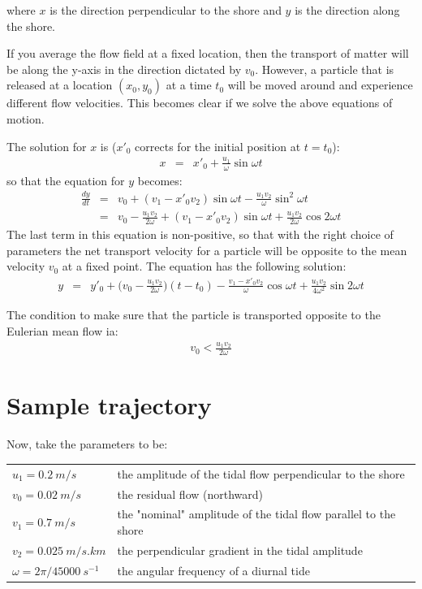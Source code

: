 \documentclass[onecolumn]{article}
\begin{document}
\noindent where $x$ is the direction perpendicular to the shore and $y$ is the direction along the shore.

If you average the flow field at a fixed location, then the transport of matter will
be along the y-axis in the direction dictated by $v_0$. However, a particle that is
released at a location $(x_0,y_0)$ at a time $t_0$ will be moved around and experience
different flow velocities. This becomes clear if we solve the above equations of motion.

The solution for $x$ is ($x'_0$ corrects for the initial position at $t = t_0$):
\begin{eqnarray}
    x &=& x'_0 + \frac{u_1}{\omega} \sin \omega t
\end{eqnarray}
\noindent so that the equation for $y$ becomes:
\begin{eqnarray}
    \frac{dy}{dt} &=& v_0 + (v_1 - x'_0 v_2) \sin \omega t - \frac{u_1 v_2}{\omega} \sin^2 \omega t \\
                  &=& v_0 - \frac{u_1 v_2}{2 \omega} + (v_1 - x'_0 v_2) \sin \omega t + \frac{u_1 v_2}{2 \omega} \cos 2 \omega t
\end{eqnarray}
The last term in this equation is non-positive, so that with the right choice of parameters the
net transport velocity for a particle will be opposite to the mean velocity $v_0$ at a fixed point.
The equation has the following solution:
\begin{eqnarray}
\label{solution}
    y &=& y'_0 + \bigl( v_0 - \frac{u_1 v_2}{2 \omega} \bigr) (t - t_0) - \frac{v_1 - x'_0 v_2}{\omega} \cos \omega t + \frac{u_1 v_2}{4 \omega^2} \sin 2 \omega t
\end{eqnarray}

The condition to make sure that the particle is transported opposite to the Eulerian mean flow ia:
\begin{eqnarray}
    v_0 < \frac{u_1 v_2}{2 \omega}
\end{eqnarray}


\section*{Sample trajectory}
Now, take the parameters to be:
%
\begin{table}[h!]
\begin{tabular}{ll}
$u_1 = 0.2~ m/s$  & the amplitude of the tidal flow perpendicular to the shore \\
$v_0 = 0.02~ m/s$ & the residual flow (northward) \\
$v_1 = 0.7~ m/s$  & the "nominal" amplitude of the tidal flow parallel to the shore \\
$v_2 = 0.025~ m/s.km$ & the perpendicular gradient in the tidal amplitude \\
$\omega = 2\pi / 45000~ s^{-1}$ & the angular frequency of a diurnal tide \\
\end{tabular}
\end{table}
\end{document}
